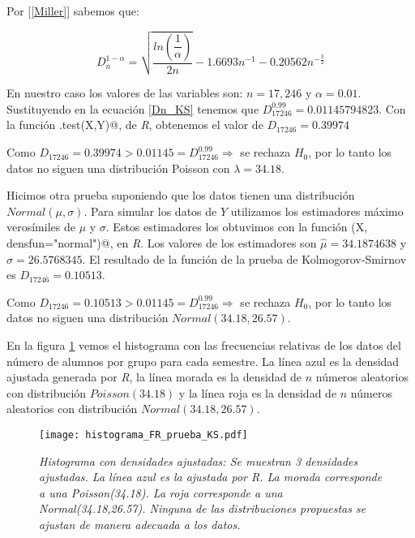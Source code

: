 Por [\ref{Miller}] sabemos que:

\begin{equation}\label{Dn_KS}
D_{n}^{1-\alpha} = \sqrt{\dfrac{ln \left(\dfrac{1}{\alpha}\right)}{2n}} - 1.6693 n^{-1} - 0.20562 n^{-\frac{3}{2}}
\end{equation}

En nuestro caso los valores de las variables son: $n = 17,246$ y $\alpha = 0.01$. Sustituyendo en la ecuación \ref{Dn_KS} tenemos que $D_{17246}^{0.99} = 0.01145794823$. Con la función \verb@ks.test(X,Y)@, de \textit{R}, obtenemos el valor de $D_{17246} = 0.39974$

Como $D_{17246} = 0.39974 > 0.01145 = D_{17246}^{0.99} \Rightarrow $ se rechaza $H_{0}$, por lo tanto los datos no siguen una distribución Poisson con $\lambda = 34.18$.


Hicimos otra prueba suponiendo que los datos tienen una distribución $Normal(\mu,\sigma)$. Para simular los datos de $Y$ utilizamos los estimadores máximo verosímiles de $\mu$ y $\sigma$. Estos estimadores los obtuvimos con la función \verb@fitdistr(X, densfun="normal")@, en \textit{R}. Los valores de los estimadores son $\hat{\mu} = 34.1874638$ y $\hat{\sigma} = 26.5768345$. El resultado de la función de la prueba de Kolmogorov-Smirnov es $D_{17246} = 0.10513$.

Como $D_{17246} = 0.10513 > 0.01145 = D_{17246}^{0.99} \Rightarrow $ se rechaza $H_{0}$, por lo tanto los datos no siguen una distribución $Normal(34.18,26.57)$.

En la figura \ref{histFR_pruebaKS} vemos el histograma con las frecuencias relativas de los datos del número de alumnos por grupo para cada semestre. La línea azul es la densidad ajustada generada por \textit{R}, la línea morada es la densidad de $n$ números aleatorios con distribución  $Poisson(34.18)$ y la línea roja es la densidad de $n$ números aleatorios con distribución  $Normal(34.18,26.57)$.

\begin{figure}[H]
\centering
\texttt{[image: histograma\_FR\_prueba\_KS.pdf]} %
\caption[\textit{Histograma con densidades ajustadas}]{\textit{Histograma con densidades ajustadas: Se muestran 3 densidades ajustadas. La línea azul es la ajustada por R. La morada corresponde a una Poisson(34.18). La roja corresponde a una Normal(34.18,26.57). Ninguna de las distribuciones propuestas se ajustan de manera adecuada a los datos.}}\label{histFR_pruebaKS}
\end{figure}

